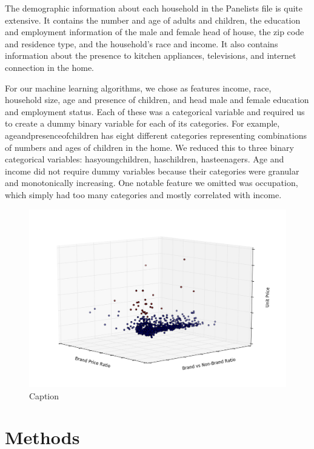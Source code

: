 \documentclass[conference]{IEEEtran}
\begin{document}
The demographic information about each household in the Panelists file is quite extensive. It contains the number and age of adults and children, the education and employment information of the male and female head of house, the zip code and residence type, and the household’s race and income. It also contains information about the presence to kitchen appliances, televisions, and internet connection in the home.
	
	
For our machine learning algorithms, we chose as features income, race, household size, age and presence of children, and head male and female education and employment status. Each of these was a categorical variable and required us to create a dummy binary variable for each of its categories. For example, age\textunderscore and\textunderscore presence\textunderscore of\textunderscore children has eight different categories representing combinations of numbers and ages of children in the home. We reduced this to three binary categorical variables: has\textunderscore young\textunderscore children, has\textunderscore children, has\textunderscore teenagers. Age and income did not require dummy variables because their categories were granular and monotonically increasing. One notable feature we omitted was occupation, which simply had too many categories and mostly correlated with income.

\begin{figure}
\centering
        \includegraphics[totalheight=6cm]{clusters}
    \caption{Caption}
    \label{fig:verticalcell}
\end{figure}
\section{Methods}
\end{document}
